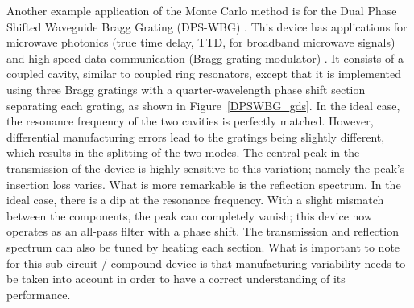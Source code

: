 \documentclass[journal]{spie}
\begin{document}
Another example application of the Monte Carlo method is for the Dual Phase Shifted Waveguide Bragg Grating (DPS-WBG) \cite{burla2013integrated, bedard2016dual}.  
This device has applications for microwave photonics (true time delay, TTD, for broadband microwave signals) \cite{burla2013integrated} and high-speed data communication (Bragg grating modulator) \cite{bedard2016dual}.  
It consists of a coupled cavity, similar to coupled ring resonators, except that it is implemented using three Bragg gratings with a quarter-wavelength phase shift section separating each grating, as shown in Figure~\ref{DPSWBG_gds}.  
In the ideal case, the resonance frequency of the two cavities is perfectly matched.  
However, differential manufacturing errors lead to the gratings being slightly different, which results in the splitting of the two modes.  
The central peak in the transmission of the device is highly sensitive to this variation; namely the peak's insertion loss varies.  
What is more remarkable is the reflection spectrum. In the ideal case, there is a dip at the resonance frequency.  
With a slight mismatch between the components, the peak can completely vanish; this device now operates as an all-pass filter with a phase shift.  
The transmission and reflection spectrum can also be tuned by heating each section.  
What is important to note for this sub-circuit / compound device is that manufacturing variability needs to be taken into account in order to have a correct understanding of  its performance.
\end{document}
